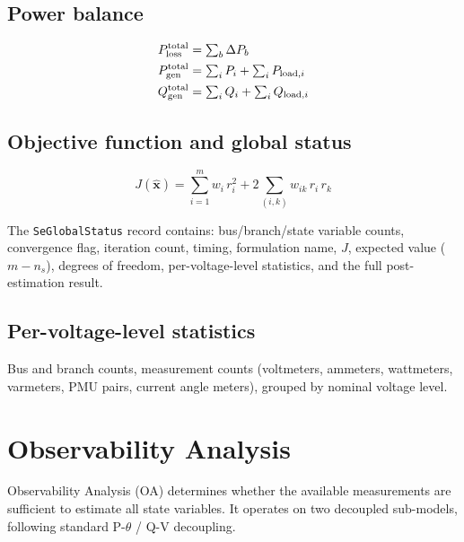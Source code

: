 \documentclass[11pt,a4paper]{article}
\begin{document}
\subsection{Power balance}

\begin{align}
  P_\text{loss}^\text{total} &= \textstyle\sum_b \Delta P_b \notag \\
  P_\text{gen}^\text{total}  &= \textstyle\sum_i P_i + \sum_i P_{\text{load},i} \notag \\
  Q_\text{gen}^\text{total}  &= \textstyle\sum_i Q_i + \sum_i Q_{\text{load},i}
\end{align}

\subsection{Objective function and global status}

\begin{equation}
  J(\hat{\mathbf{x}}) = \sum_{i=1}^{m} w_i\,r_i^2
    + 2\sum_{(i,k)} w_{ik}\,r_i\,r_k
\end{equation}

\noindent
The \texttt{SeGlobalStatus} record contains: bus/branch/state variable
counts, convergence flag, iteration count, timing, formulation name,
$J$, expected value ($m - n_s$), degrees of freedom, per-voltage-level
statistics, and the full post-estimation result.

\subsection{Per-voltage-level statistics}

Bus and branch counts, measurement counts (voltmeters, ammeters,
wattmeters, varmeters, PMU pairs, current angle meters), grouped by
nominal voltage level.



\section{Observability Analysis}\label{sec:obs}

Observability Analysis (\gls{OA}) determines whether the available
measurements are sufficient to estimate all state variables.  It operates
on two decoupled sub-models, following standard P-$\theta$ / Q-V
decoupling.
\end{document}
